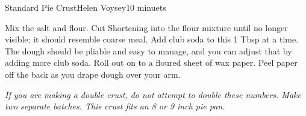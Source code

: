 \begin{recipe}{Standard Pie Crust}{Helen Voysey}{10 minuets}

  Mix the salt and flour. Cut Shortening into the flour mixture until no
  longer visible; it should resemble coarse meal. Add club soda to this
  1 Tbsp at a time. The dough should be pliable and easy to manage,
  and you can adjust that by adding more club soda. Roll out on to a
  floured sheet of wax paper. Peel paper off the back as you drape
  dough over your arm.
\end{recipe}
\textit{If you are making a double crust, do not attempt to double
  these numbers. Make two separate batches. This crust fits an 8 or 9
  inch pie pan.}
